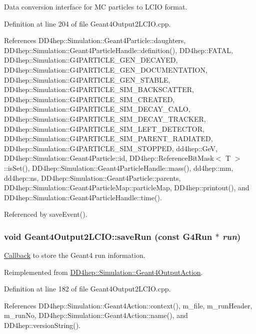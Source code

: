 Data conversion interface for MC particles to LCIO format. 

Definition at line 204 of file Geant4Output2LCIO.cpp.

References DD4hep::Simulation::Geant4Particle::daughters, DD4hep::Simulation::Geant4ParticleHandle::definition(), DD4hep::FATAL, DD4hep::Simulation::G4PARTICLE\_\-GEN\_\-DECAYED, DD4hep::Simulation::G4PARTICLE\_\-GEN\_\-DOCUMENTATION, DD4hep::Simulation::G4PARTICLE\_\-GEN\_\-STABLE, DD4hep::Simulation::G4PARTICLE\_\-SIM\_\-BACKSCATTER, DD4hep::Simulation::G4PARTICLE\_\-SIM\_\-CREATED, DD4hep::Simulation::G4PARTICLE\_\-SIM\_\-DECAY\_\-CALO, DD4hep::Simulation::G4PARTICLE\_\-SIM\_\-DECAY\_\-TRACKER, DD4hep::Simulation::G4PARTICLE\_\-SIM\_\-LEFT\_\-DETECTOR, DD4hep::Simulation::G4PARTICLE\_\-SIM\_\-PARENT\_\-RADIATED, DD4hep::Simulation::G4PARTICLE\_\-SIM\_\-STOPPED, dd4hep::GeV, DD4hep::Simulation::Geant4Particle::id, DD4hep::ReferenceBitMask$<$ T $>$::isSet(), DD4hep::Simulation::Geant4ParticleHandle::mass(), dd4hep::mm, dd4hep::ns, DD4hep::Simulation::Geant4Particle::parents, DD4hep::Simulation::Geant4ParticleMap::particleMap, DD4hep::printout(), and DD4hep::Simulation::Geant4ParticleHandle::time().

Referenced by saveEvent().\hypertarget{class_d_d4hep_1_1_simulation_1_1_geant4_output2_l_c_i_o_a0fa2240decba857840eed494d6349f5f}{
\subsubsection[{saveRun}]{\setlength{\rightskip}{0pt plus 5cm}void Geant4Output2LCIO::saveRun (const G4Run $\ast$ {\em run})}}
\label{class_d_d4hep_1_1_simulation_1_1_geant4_output2_l_c_i_o_a0fa2240decba857840eed494d6349f5f}


\hyperlink{class_d_d4hep_1_1_callback}{Callback} to store the Geant4 run information. 

Reimplemented from \hyperlink{class_d_d4hep_1_1_simulation_1_1_geant4_output_action_a4016b3e0ee787a3ac3d1fcd7a4c84a68}{DD4hep::Simulation::Geant4OutputAction}.

Definition at line 182 of file Geant4Output2LCIO.cpp.

References DD4hep::Simulation::Geant4Action::context(), m\_\-file, m\_\-runHeader, m\_\-runNo, DD4hep::Simulation::Geant4Action::name(), and DD4hep::versionString().

